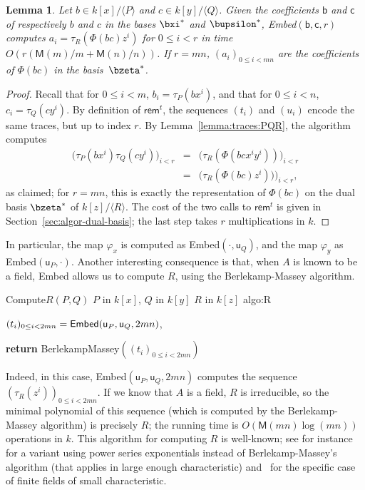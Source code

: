 \documentclass{sig-alternate}
\def\M {\ensuremath{\mathsf{M}}}
\def\vu {\ensuremath{\mathsf{u}}}
\def\vb {\ensuremath{\mathsf{b}}}
\def\vc {\ensuremath{\mathsf{c}}}
\def\rem {\ensuremath{\mathsf{rem}}}
\newcounter{algo}
\newenvironment{algorithm_endline}[4]{\small\begin{center}\begin{minipage}{0.48\textwidth}
      \refstepcounter{algo}
      \label{#4}
      \sf
      \rule{\textwidth}{0.2pt}\\
      \makebox[\textwidth][c]{Algorithm~\arabic{algo}:~\textbf{#1}}\\
      \rule[0.5\baselineskip]{\textwidth}{0.2pt}\\

      \vspace{-12pt}

      \parbox{\textwidth}{\textbf{Input} #2}
      \parbox{\textwidth}{\textbf{Output} #3}

\vspace{-7pt}

      \begin{enumerate*}}{\end{enumerate*}
      \vspace{-11pt}
      \rule{\textwidth}{0.2pt}
\end{minipage}\end{center}
}
\newcommand{\ang}[1]{\langle#1\rangle}
\newtheorem{Lemma}{Lemma}
\begin{document}
\begin{Lemma}\label{lemma:algo:embed}
  Let $b \in k[x]/\ang{P}$ and $c \in k[y]/\ang{Q}$.  Given the
  coefficients $\vb$ and $\vc$ of respectively $b$ and $c$ in the
  bases $\bxi^\ast$ and $\bupsilon^\ast$, {\sf Embed}$(\vb,\vc,r)$
  computes $a_i=\tau_R\left(\Phi(bc)z^i\right)$ for $0 \le i < r$ in time
  $O(r(\M(m)/m+\M(n)/n))$. If $r=mn$, $(a_i)_{0 \le i < mn}$ are
  the coefficients of $\Phi(bc)$ in the basis~$\bzeta^\ast$.
\end{Lemma}
\begin{proof}
  Recall that for $0 \le i <m$, $b_i = \tau_P(bx^i)$, and that for $0
  \le i < n$, $c_i = \tau_Q(cy^i)$. By definition of $\rem^t$, the
  sequences $(t_i)$ and $(u_i)$ encode the same traces, but up to
  index $r$.  By Lemma~\ref{lemma:traces:PQR}, the algorithm
  computes
  \begin{eqnarray*}
    \bigl(\tau_P(bx^i)\tau_Q(cy^i)\bigr)_{i<r} &=&  \bigl(\tau_R(\Phi(bc x^i y^i))\bigr)_{i<r}\\
    &=&  \bigl(\tau_R(\Phi(bc) z^i))\bigr)_{i<r},
  \end{eqnarray*}
  as claimed; for $r=mn$, this is exactly the representation of
  $\Phi(bc)$ on the dual basis $\bzeta^\ast$ of $k[z]/\ang{R}$. The
  cost of the two calls to $\rem^t$ is given in
  Section~\ref{sec:algor-dual-basis}; the last step takes $r$
  multiplications in $k$.
\end{proof}

In particular, the map $\varphi_x$ is computed as
{\sf Embed}$(\cdot,\vu_Q)$, and the map $\varphi_y$ as
{\sf Embed}$(\vu_P,\cdot)$. Another interesting consequence is that, when
$A$ is known to be a field, {\sf Embed} allows us to compute $R$, using the
Berlekamp-Massey algorithm.

\vspace{-2ex}

\begin{algorithm_endline}
{Compute$R(P,Q)$}
{$P$ in $k[x]$, $Q$ in $k[y]$}
{$R$ in $k[z]$}
{algo:R}
\item $(t_i)_{0 \le i < 2mn}={\sf Embed}(\vu_P,\vu_Q,2mn)$,
\item {\bf return} BerlekampMassey$((t_i)_{0 \le i < 2mn})$
\end{algorithm_endline}

Indeed, in this case, {\sf Embed}$(\vu_P,\vu_Q,2mn)$ computes the sequence
$(\tau_R(z^i))_{0\le i < 2mn}$. If we know that $A$ is a field, $R$ is
irreducible, so the minimal polynomial of this sequence (which is
computed by the Berlekamp-Massey algorithm) is precisely $R$; the
running time is $O(\M(mn)\log(mn))$ operations in $k$. This algorithm
for computing $R$ is well-known; see for instance~\cite{BoFlSaSc06}
for a variant using power series exponentials instead of
Berlekamp-Massey's algorithm (that applies in large enough
characteristic) and~\cite{BGPS05} for the specific case of finite
fields of small characteristic.
\end{document}

